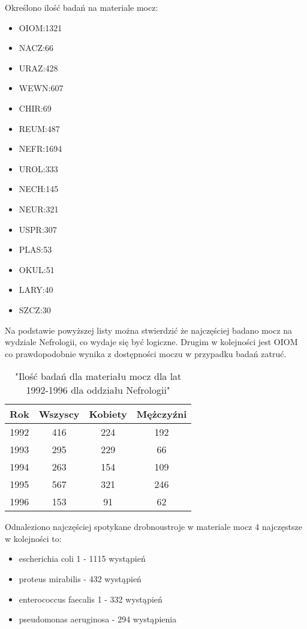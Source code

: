 \documentclass[a4paper,11pt]{article}
\begin{document}
Określono ilość badań na materiale mocz:
\begin{itemize}
\item OIOM:1321
\item NACZ:66
\item URAZ:428
\item WEWN:607
\item CHIR:69
\item REUM:487
\item NEFR:1694
\item UROL:333
\item NECH:145
\item NEUR:321
\item USPR:307
\item PLAS:53
\item OKUL:51
\item LARY:40
\item SZCZ:30
\end{itemize}
Na podstawie powyższej listy można stwierdzić że najczęściej badano mocz na wydziale
 Nefrologii, co wydaje się być logiczne. 
Drugim w kolejności jest OIOM co prawdopodobnie wynika z dostępności moczu w przypadku badań zatruć.  

\begin{table}[h]
  \begin{center}
  \caption{"Ilość badań dla materiału mocz dla lat 1992-1996 dla oddziału Nefrologii"}
  \begin{tabular}{|c|c|c|c|}
    \hline
    Rok & Wszyscy & Kobiety & Mężczyźni \\ \hline
1992 &416 &224 &192\\ \hline
1993 &295 &229 &66\\ \hline
1994 &263 &154 &109\\ \hline
1995 &567 &321 &246\\ \hline
1996 &153 &91 &62\\ \hline
  \end{tabular}
\end{center}
\end{table}


Odnaleziono najczęściej spotykane drobnoustroje w materiale mocz 4 najczęstsze w kolejności to:
\begin{itemize}
\item escherichia coli 1 - 1115 wystąpień
\item proteus mirabilis - 432 wystąpień
\item enterococcus faecalis 1 - 332 wystąpień
\item pseudomonas aeruginosa - 294 wystąpienia
\end{itemize}
\end{document}
